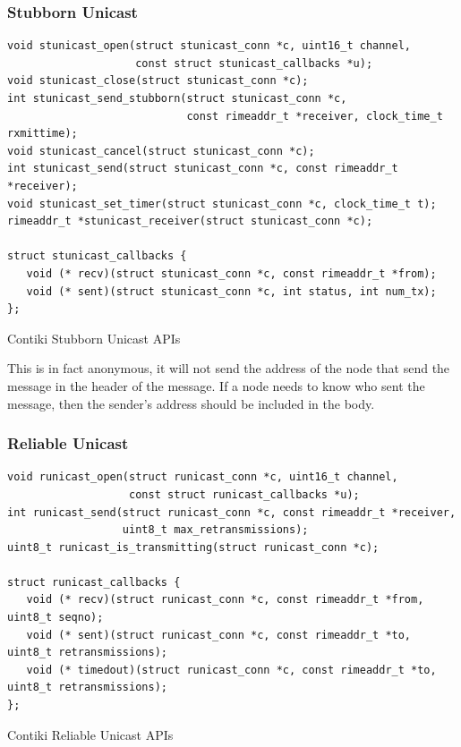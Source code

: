 \subsubsection{Stubborn Unicast}

\begin{listing}[H]
\begin{verbatim}
void stunicast_open(struct stunicast_conn *c, uint16_t channel,
                    const struct stunicast_callbacks *u);
void stunicast_close(struct stunicast_conn *c);
int stunicast_send_stubborn(struct stunicast_conn *c,
                            const rimeaddr_t *receiver, clock_time_t rxmittime);
void stunicast_cancel(struct stunicast_conn *c);
int stunicast_send(struct stunicast_conn *c, const rimeaddr_t *receiver);
void stunicast_set_timer(struct stunicast_conn *c, clock_time_t t);
rimeaddr_t *stunicast_receiver(struct stunicast_conn *c);

struct stunicast_callbacks {
   void (* recv)(struct stunicast_conn *c, const rimeaddr_t *from);
   void (* sent)(struct stunicast_conn *c, int status, int num_tx);
};
\end{verbatim}
\caption{Contiki Stubborn Unicast APIs}
\end{listing}

This is in fact anonymous, it will not send the address of the node that send the message in the header of the message. If a node needs to know who sent the message, then the sender's address should be included in the body.


\subsubsection{Reliable Unicast}

\begin{listing}[H]
\begin{verbatim}
void runicast_open(struct runicast_conn *c, uint16_t channel,
                   const struct runicast_callbacks *u);
int runicast_send(struct runicast_conn *c, const rimeaddr_t *receiver,
                  uint8_t max_retransmissions);
uint8_t runicast_is_transmitting(struct runicast_conn *c);

struct runicast_callbacks {
   void (* recv)(struct runicast_conn *c, const rimeaddr_t *from, uint8_t seqno);
   void (* sent)(struct runicast_conn *c, const rimeaddr_t *to, uint8_t retransmissions);
   void (* timedout)(struct runicast_conn *c, const rimeaddr_t *to, uint8_t retransmissions);
};
\end{verbatim}
\caption{Contiki Reliable Unicast APIs}
\end{listing}

